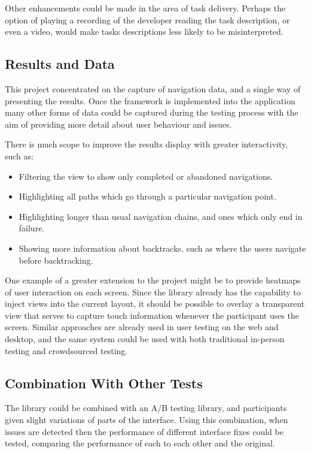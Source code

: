 Other enhancements could be made in the area of task delivery. Perhaps
the option of playing a recording of the developer reading the task
description, or even a video, would make tasks descriptions less likely
to be misinterpreted.

\subsection{Results and Data}

This project concentrated on the capture of navigation data, and a single
way of presenting the results. Once the framework is implemented into the
application many other forms of data could be captured during the testing
process with the aim of providing more detail about user behaviour and
issues.

There is much scope to improve the results display with greater interactivity,
such as:

\begin{itemize}
  \item Filtering the view to show only completed or abandoned navigations.
  \item Highlighting all paths which go through a particular navigation point.
  \item Highlighting longer than usual navigation chains, and ones which only end in failure.
  \item Showing more information about backtracks, such as where the users
        navigate before backtracking.
\end{itemize}


One example of a greater extension to the project might be to provide heatmaps
of user interaction on each screen. Since the library already has the
capability to inject views into the current layout, it should be possible
to overlay a transparent view that serves to capture touch information
whenever the participant uses the screen. Similar approaches are already
used in user testing on the web and desktop, and the same system could
be used with both traditional in-person testing and crowdsourced testing.


\subsection{Combination With Other Tests}

The library could be combined with an A/B testing library, and participants
given slight variations of parts of the interface. Using this combination, 
when issues are detected then the performance of different interface fixes
could be tested, comparing the performance of each to each other and the original.